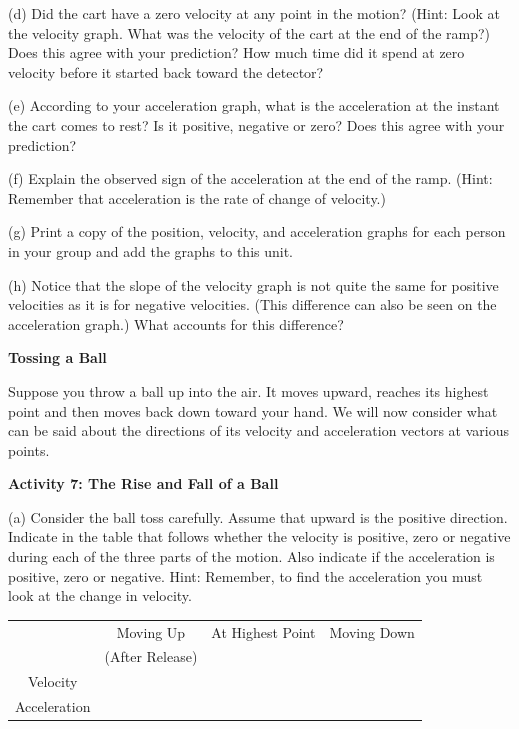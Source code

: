 (d) Did the cart have a zero velocity at any point in the motion? (Hint: Look
at the velocity graph. What was the velocity of the cart at the end of the ramp?)
Does this agree with your prediction? How much time did it spend at zero velocity
before it started back toward the detector?
\vspace{20mm}

(e) According to your acceleration graph, what is the acceleration at the instant
the cart comes to rest? Is it positive, negative or zero? Does this agree with
your prediction? 
\vspace{20mm}

(f) Explain the observed sign of the acceleration at the end of the ramp. (Hint: Remember that acceleration is the rate of change of velocity.) 
\vspace{20mm}

(g) Print a copy of the position, velocity, and acceleration graphs for each person in your group and add the graphs to this unit.

(h) Notice that the slope of the velocity graph is not quite the same for positive velocities as it is for negative velocities. (This difference can also be seen on the acceleration graph.) What accounts for this difference?
\vspace{20mm}

\textbf{Tossing a Ball }

Suppose you throw a ball up into the air. It moves upward, reaches its highest
point and then moves back down toward your hand. We will now consider what can be said about the directions of its velocity and acceleration vectors at various points.

\textbf{Activity 7: The Rise and Fall of a Ball} 

(a) Consider the ball toss carefully. Assume that upward is the positive direction.
Indicate in the table that follows whether the velocity is positive, zero or
negative during each of the three parts of the motion. Also indicate if the
acceleration is positive, zero or negative. Hint: Remember, to find the acceleration
you must look at the change in velocity.

\vspace{0.3cm}
{\centering \begin{tabular}{|c|c|c|c|}
\hline 
&
Moving Up&
At Highest Point&
Moving Down\\
&
(After Release)&
&
\\
\hline 
Velocity&
&
&
\\
\hline 
Acceleration&
&
&
\\
\hline 
\end{tabular}\par}
\vspace{0.3cm}

